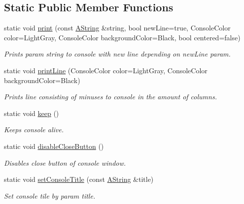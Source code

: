 \subsection*{Static Public Member Functions}
\begin{DoxyCompactItemize}
\item 
static void \mbox{\hyperlink{class_console_a4431c41c8648bc54c933add04e2032e7}{print}} (const \mbox{\hyperlink{class_a_string}{A\+String}} \&string, bool new\+Line=true, Console\+Color color=Light\+Gray, Console\+Color background\+Color=Black, bool centered=false)
\begin{DoxyCompactList}\small\item\em Prints param string to console with new line depending on new\+Line param. \end{DoxyCompactList}\item 
\mbox{\label{class_console_ad7a14ece00d66f511beadc989c8aa21e}} 
static void \mbox{\hyperlink{class_console_ad7a14ece00d66f511beadc989c8aa21e}{print\+Line}} (Console\+Color color=Light\+Gray, Console\+Color background\+Color=Black)
\begin{DoxyCompactList}\small\item\em Prints line consisting of minuses to console in the amount of columns. \end{DoxyCompactList}\item 
static void \mbox{\hyperlink{class_console_a0d9c8a62ea99c6e7cc7b59975785c802}{keep}} ()
\begin{DoxyCompactList}\small\item\em Keeps console alive. \end{DoxyCompactList}\item 
\mbox{\label{class_console_a446e3df3f4aab16d69b4d775bf038146}} 
static void \mbox{\hyperlink{class_console_a446e3df3f4aab16d69b4d775bf038146}{disable\+Close\+Button}} ()
\begin{DoxyCompactList}\small\item\em Disables close button of console window. \end{DoxyCompactList}\item 
static void \mbox{\hyperlink{class_console_a897788b6d4f90a73b1894c4a83bb8280}{set\+Console\+Title}} (const \mbox{\hyperlink{class_a_string}{A\+String}} \&title)
\begin{DoxyCompactList}\small\item\em Set console tile by param title. \end{DoxyCompactList}\item 

\end{DoxyCompactItemize}
